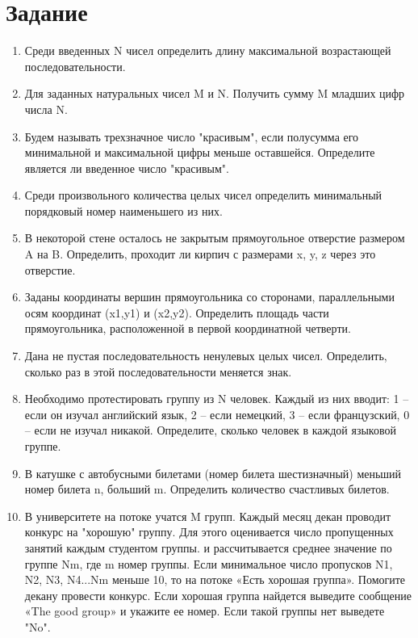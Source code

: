 \documentclass[a4paper,14pt]{extarticle}
\begin{document}
	\section*{Задание}
	\begin{enumerate}
		\item Среди введенных N чисел определить длину максимальной возрастающей последовательности.
		
		\item Для заданных натуральных чисел M и N. Получить сумму M младших цифр числа N.
		
		\item Будем называть трехзначное число "красивым", если полусумма его минимальной и максимальной цифры меньше оставшейся. Определите является ли введенное число "красивым".
		
		\item Среди произвольного количества целых чисел определить минимальный порядковый номер наименьшего из них.
		
		\item В некоторой стене осталось не закрытым прямоугольное отверстие размером A на B. Определить, проходит ли кирпич с размерами x, y, z через это отверстие.
		
		\item Заданы координаты вершин прямоугольника со сторонами, параллельными осям координат (x1,y1) и (x2,y2). Определить площадь части прямоугольника, расположенной в первой координатной четверти.
		
		\item Дана не пустая последовательность ненулевых целых чисел. Определить, сколько раз в этой последовательности меняется знак.
		
		\item Необходимо протестировать группу из N человек. Каждый из них вводит: 1 – если он изучал английский язык, 2 – если немецкий, 3 – если французский, 0 – если не изучал никакой. Определите, сколько человек в каждой языковой группе.
		
		\item В катушке с автобусными билетами (номер билета шестизначный) меньший номер билета n, больший m. Определить количество счастливых билетов.
		
		\item В университете на потоке учатся M групп. Каждый месяц декан проводит конкурс на "хорошую" группу. Для этого оценивается число пропущенных занятий каждым студентом группы. и рассчитывается среднее значение по группе Nm, где m номер группы. Если минимальное число пропусков N1, N2, N3, N4...Nm меньше 10, то на потоке «Есть хорошая группа». Помогите декану провести конкурс. Если хорошая группа найдется выведите сообщение «The good group» и укажите ее номер. Если такой группы нет выведете "No".
		

\end{enumerate}
\end{document}
